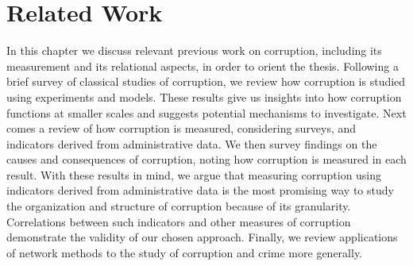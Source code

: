 \chapter{Related Work}\label{ch:litReview}

In this chapter we discuss relevant previous work on corruption, including its measurement and its relational aspects, in order to orient the thesis. Following a brief survey of classical studies of corruption, we review how corruption is studied using experiments and models. These results give us insights into how corruption functions at smaller scales and suggests potential mechanisms to investigate. Next comes a review of how corruption is measured, considering surveys, and indicators derived from administrative data. We then survey findings on the causes and consequences of corruption, noting how corruption is measured in each result. With these results in mind, we argue that measuring corruption using indicators derived from administrative data is the most promising way to study the organization and structure of corruption because of its granularity. Correlations between such indicators and other measures of corruption demonstrate the validity of our chosen approach. Finally, we review applications of network methods to the study of corruption and crime more generally.
